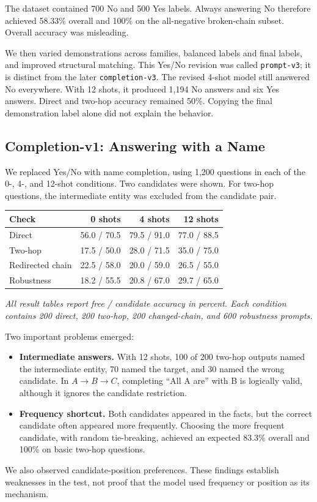 \documentclass[11pt,a4paper]{article}
\begin{document}
The dataset contained 700 No and 500 Yes labels. Always answering No therefore achieved 58.33\% overall and 100\% on the all-negative broken-chain subset. Overall accuracy was misleading.

We then varied demonstrations across families, balanced labels and final labels, and improved structural matching. This Yes/No revision was called \texttt{prompt-v3}; it is distinct from the later \texttt{completion-v3}. The revised 4-shot model still answered No everywhere. With 12 shots, it produced 1,194 No answers and six Yes answers. Direct and two-hop accuracy remained 50\%. Copying the final demonstration label alone did not explain the behavior.

\subsection{Completion-v1: Answering with a Name}
We replaced Yes/No with name completion, using 1,200 questions in each of the 0-, 4-, and 12-shot conditions. Two candidates were shown. For two-hop questions, the intermediate entity was excluded from the candidate pair.

\begin{center}\small
\begin{tabular}{lrrr}
\toprule
Check & 0 shots & 4 shots & 12 shots\\\midrule
Direct & 56.0 / 70.5 & 79.5 / 91.0 & 77.0 / 88.5\\
Two-hop & 17.5 / 50.0 & 28.0 / 71.5 & 35.0 / 75.0\\
Redirected chain & 22.5 / 58.0 & 20.0 / 59.0 & 26.5 / 55.0\\
Robustness & 18.2 / 55.5 & 20.8 / 67.0 & 29.7 / 65.0\\\bottomrule
\end{tabular}
\end{center}
\textit{All result tables report free / candidate accuracy in percent. Each condition contains 200 direct, 200 two-hop, 200 changed-chain, and 600 robustness prompts.}

Two important problems emerged:
\begin{itemize}
\item \textbf{Intermediate answers.} With 12 shots, 100 of 200 two-hop outputs named the intermediate entity, 70 named the target, and 30 named the wrong candidate. In $A\rightarrow B\rightarrow C$, completing ``All A are'' with B is logically valid, although it ignores the candidate restriction.
\item \textbf{Frequency shortcut.} Both candidates appeared in the facts, but the correct candidate often appeared more frequently. Choosing the more frequent candidate, with random tie-breaking, achieved an expected 83.3\% overall and 100\% on basic two-hop questions.
\end{itemize}
We also observed candidate-position preferences. These findings establish weaknesses in the test, not proof that the model used frequency or position as its mechanism.
\end{document}
